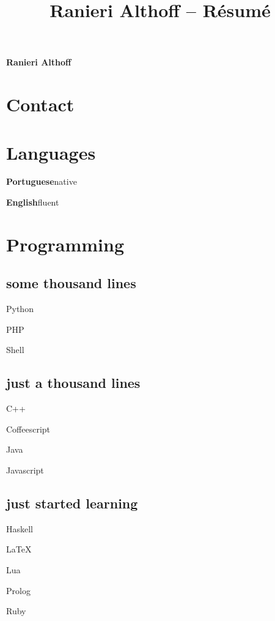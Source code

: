 \documentclass{article}
\newcommand{\languageentry}[2]{
	\parbox{\textwidth}{\hfill \textbf{#1}\hspace{1em}#2}
}
\newenvironment{aside}{
\begin{minipage}[t]{0.25\textwidth}
\begin{flushright}
}{
\end{flushright}
\end{minipage}
}
\begin{document}
 \selectfont

\title{Ranieri Althoff -- Résumé}

\Huge \hfill \textbf{Ranieri Althoff}
\normalsize \par
\vspace{3em}

\begin{aside}
\section*{Contact}


\section*{Languages}
\languageentry{Portuguese}{native}
\languageentry{English}{fluent}


\section*{Programming}
\center
\subsection*{\small some thousand lines}
\begin{enumerate*}[label={}]
\item{Python}
\item{PHP}
\item{Shell}
\end{enumerate*}

\subsection*{\small just a thousand lines}
\begin{enumerate*}[label={}]
\item{C++}
\item{Coffeescript}
\item{Java}
\item{Javascript}
\end{enumerate*}

\subsection*{\small just started learning}
\begin{enumerate*}[label={}]
\item{Haskell}
\item{\LaTeX}
\item{Lua}
\item{Prolog}
\item{Ruby}
\end{enumerate*}


\end{aside}
\end{document}
